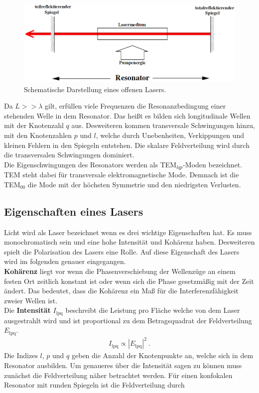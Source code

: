 \begin{figure}[H]
	\includegraphics[width=\linewidth]{Bilder/Resonator.png}
	\caption{Schematische Darstellung eines offenen Lasers. \cite{V61}}
	\label{fig:Laser}
\end{figure}

Da $L >> \lambda$ gilt, erfüllen viele Frequenzen die Resonanzbedingung einer stehenden Welle in dem Resonator. Das heißt es bilden sich longitudinale Wellen mit der Knotenzahl $q$ aus. Desweiteren kommen transversale Schwingungen hinzu, mit den Knotenzahlen $p$ und $l$, welche durch Unebenheiten, Verkippungen und kleinen Fehlern in den Spiegeln entstehen. Die skalare Feldverteilung wird durch die transversalen Schwingungen dominiert. \\
Die Eigenschwingungen des Resonators werden als TEM$_{lqp}$-Moden bezeichnet. TEM steht dabei für transversale elektromagnetische Mode. Demnach ist die TEM$_{00}$ die Mode mit der höchsten Symmetrie und den niedrigsten Verlusten.

\subsection{Eigenschaften eines Lasers}
Licht wird als Laser bezeichnet wenn es drei wichtige Eigenschaften hat. Es muss monochromatisch sein und eine hohe Intensität und Kohärenz haben. Desweiteren spielt die Polarisation des Lasers eine Rolle. Auf diese Eigenschaft des Lasers wird im folgenden genauer eingegangen. \\
\textbf{Kohärenz} liegt vor wenn die Phasenverschiebung der Wellenzüge an einem festen Ort zeitlich konstant ist oder wenn sich die Phase gesetzmäßig mit der Zeit ändert.
Das bedeutet, dass die Kohärenz ein Maß für die Interferenzfähigkeit zweier Wellen ist. \\
Die \textbf{Intensität} $I_\text{lpq}$ beschreibt die Leistung pro Fläche welche von dem Laser ausgestrahlt wird und ist proportional zu dem Betragsquadrat der Feldverteilung $E_\text{lpq}$.
\begin{align*}
	I_\text{lpq} \propto |E_\text{lpq}|^2 \ .
\end{align*}
Die Indizes $l$, $p$ und $q$ geben die Anzahl der Knotenpunkte an, welche sich in dem Resonator ausbilden. Um genaueres über die Intensität sagen zu können muss zunächst die Feldverteilung näher betrachtet werden. Für einen konfokalen Resonator mit runden Spiegeln ist die Feldverteilung durch

